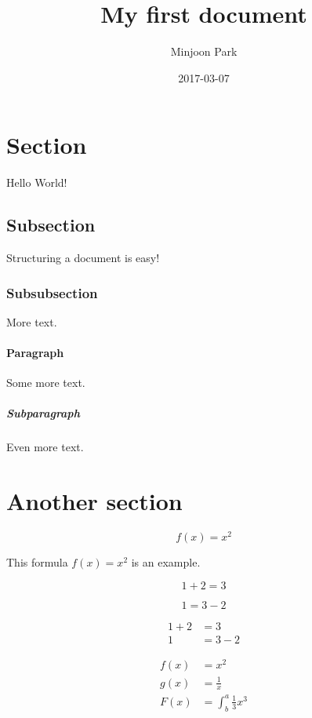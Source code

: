 \documentclass{article}
\title{My first document}
\date{2017-03-07}
\author{Minjoon Park}
\begin{document}
  \maketitle
  \newpage
  \tableofcontents
  \newpage

\section{Section}

Hello World!

\subsection{Subsection}

Structuring a document is easy!

\subsubsection{Subsubsection}

More text.

\paragraph{Paragraph}

Some more text.

\subparagraph{Subparagraph}

Even more text.

\section{Another section}

\begin{equation}
  f(x) = x^2
\end{equation}

This formula $f(x) = x^2$ is an example.

\begin{equation*}
  1 + 2 = 3
\end{equation*}

\begin{equation*}
  1 = 3 - 2
\end{equation*}

\begin{align*}
  1 + 2 &= 3\\
  1 &= 3 - 2
\end{align*}

\begin{align*}
  f(x) &= x^2\\
  g(x) &= \frac{1}{x}\\
  F(x) &= \int^a_b \frac{1}{3}x^3
\end{align*}
\end{document}
